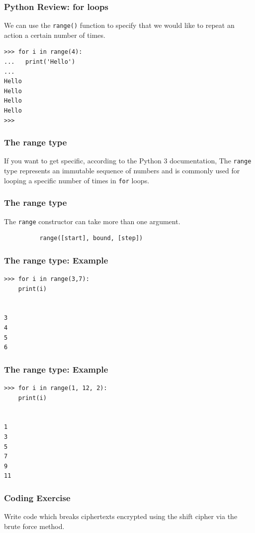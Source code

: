 \documentclass{beamer}
\newcommand{\<}{\langle}
\renewcommand{\>}{\rangle}
\begin{document}
\begin{frame}[fragile]
\frametitle{Python Review: for loops}

We can use the \verb|range()| function to specify that we would like to repeat an action a certain number of times.
\begin{verbatim}
>>> for i in range(4):
...   print('Hello')
...
Hello
Hello
Hello
Hello
>>> 
\end{verbatim}
\end{frame}


\begin{frame}[fragile]
\frametitle{The range type}

If you want to get specific, according to the Python 3 documentation, The \verb|range| type represents an immutable sequence of numbers and is commonly used for looping a specific number of times in \verb|for| loops.
\end{frame}


\begin{frame}[fragile]
\frametitle{The range type}

The \verb|range| constructor can take more than one argument. 
\begin{verbatim}
          range([start], bound, [step])
\end{verbatim}
\end{frame}


\begin{frame}[fragile]
\frametitle{The range type: Example}

\begin{verbatim}
>>> for i in range(3,7):
	print(i)

	
3
4
5
6
\end{verbatim}
\end{frame}

\begin{frame}[fragile]
\frametitle{The range type: Example}

\begin{verbatim}
>>> for i in range(1, 12, 2):
	print(i)

	
1
3
5
7
9
11
\end{verbatim}
\end{frame}


\begin{frame}
\frametitle{Coding Exercise}

Write code which breaks ciphertexts encrypted using the shift cipher via the brute force method.
\end{frame}
\end{document}
